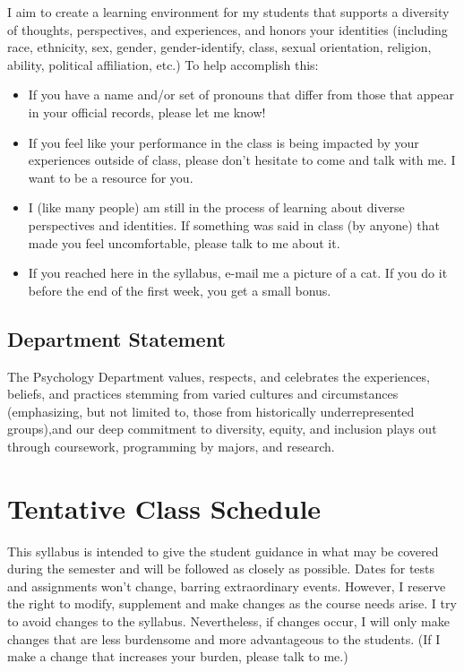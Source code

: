 \documentclass[11pt,]{article}
\begin{document}
I aim to create a learning environment for my students that supports a
diversity of thoughts, perspectives, and experiences, and honors your
identities (including race, ethnicity, sex, gender, gender-identify,
class, sexual orientation, religion, ability, political affiliation,
etc.) To help accomplish this:

\begin{itemize}
\item
  If you have a name and/or set of pronouns that differ from those that
  appear in your official records, please let me know!
\item
  If you feel like your performance in the class is being impacted by
  your experiences outside of class, please don't hesitate to come and
  talk with me. I want to be a resource for you.
\item
  I (like many people) am still in the process of learning about diverse
  perspectives and identities. If something was said in class (by
  anyone) that made you feel uncomfortable, please talk to me about it.
\item
  If you reached here in the syllabus, e-mail me a picture of a cat. If
  you do it before the end of the first week, you get a small bonus.
\end{itemize}

\hypertarget{department-statement}{%
\subsection{Department Statement}\label{department-statement}}

The Psychology Department values, respects, and celebrates the
experiences, beliefs, and practices stemming from varied cultures and
circumstances (emphasizing, but not limited to, those from historically
underrepresented groups),and our deep commitment to diversity, equity,
and inclusion plays out through coursework, programming by majors, and
research.

\hypertarget{tentative-class-schedule}{%
\section{Tentative Class Schedule}\label{tentative-class-schedule}}

This syllabus is intended to give the student guidance in what may be
covered during the semester and will be followed as closely as possible.
Dates for tests and assignments won't change, barring extraordinary
events. However, I reserve the right to modify, supplement and make
changes as the course needs arise. I try to avoid changes to the
syllabus. Nevertheless, if changes occur, I will only make changes that
are less burdensome and more advantageous to the students. (If I make a
change that increases your burden, please talk to me.)
\end{document}

